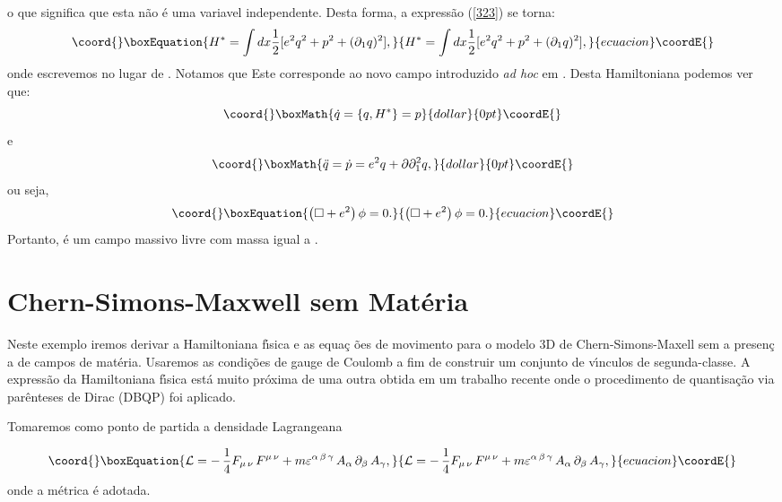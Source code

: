 \documentclass[a4paper,thmsa,12pt]{report}
\begin{document}
o que significa que esta n\~{a}o \'{e} uma variavel independente. Desta
forma, a express\~{a}o (\ref{323}) se torna: 
\begin{equation}\coord{}\boxEquation{
H^{\ast }=\int dx\frac{1}{2}[e^{2}q^{2}+p^{2}+(\partial _{1}q)^{2}],
\label{325}
}{
H^{\ast }=\int dx\frac{1}{2}[e^{2}q^{2}+p^{2}+(\partial _{1}q)^{2}],
}{ecuacion}\coordE{}\end{equation}
onde escrevemos \coordHE{} no lugar de \coordHE{}.
Notamos que \coordHE{}
Este corresponde ao novo campo introduzido \textit{ad hoc }em \cite{clovis}.
Desta Hamiltoniana podemos ver que:
$$\coord{}\boxMath{\dot{q}=\left\{ q,H^{\ast }\right\} =p}{dollar}{0pt}\coordE{}$$ 
e 
$$\coord{}\boxMath{\ddot{q}=\dot{p}=e^{2}q+\partial \partial _{1}^{2}q,}{dollar}{0pt}\coordE{}$$ 
ou seja, 
\begin{equation}\coord{}\boxEquation{
\left( \square +e^{2}\right) \phi =0.  \label{326}
}{
\left( \square +e^{2}\right) \phi =0.  }{ecuacion}\coordE{}\end{equation}
Portanto, \myHighlight{$\phi $}\coordHE{} \'{e} um campo massivo livre com massa igual a \coordHE{}.

\section{{\sc Chern-Simons-Maxwell sem Mat\'eria}}

Neste exemplo iremos derivar a Hamiltoniana f\'{\i}sica e as equa\c{c}%
\~{o}es de movimento para o modelo 3D de Chern-Simons-Maxell sem a presen\c{c%
}a de campos de mat\'{e}ria. Usaremos as condi\c{c}\~{o}es de gauge de
Coulomb a fim de construir um conjunto de v\'{\i}nculos de segunda-classe. A
express\~{a}o da Hamiltoniana f\'{\i}sica est\'{a} muito pr\'{o}xima de uma
outra obtida em um trabalho recente\cite{devecchi} onde o procedimento de
quantisa\c{c}\~{a}o via par\^{e}nteses de Dirac (DBQP) foi aplicado.

Tomaremos como ponto de partida a densidade Lagrangeana

\begin{equation}\coord{}\boxEquation{
\mathcal{L}=-\,\frac{1}{4}F_{\mu \,\nu }\,F^{\mu \,\nu }+m\varepsilon
^{\alpha \,\beta \,\gamma }\,A_{\alpha }\,\partial _{\beta }\,A_{\gamma },
\label{327}
}{
\mathcal{L}=-\,\frac{1}{4}F_{\mu \,\nu }\,F^{\mu \,\nu }+m\varepsilon
^{\alpha \,\beta \,\gamma }\,A_{\alpha }\,\partial _{\beta }\,A_{\gamma },
}{ecuacion}\coordE{}\end{equation}
\bigskip onde a m\'{e}trica \coordHE{} \'{e} adotada.\myHighlight{$%
\smallskip \medskip $}\coordHE{}
\end{document}
